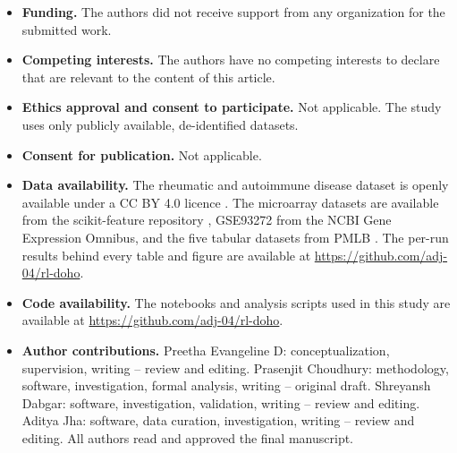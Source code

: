 \documentclass[pdflatex,sn-basic]{sn-jnl}
\begin{document}
\begin{itemize}
\item \textbf{Funding.} The authors did not receive support from any organization for the submitted work.
\item \textbf{Competing interests.} The authors have no competing interests to declare that are relevant to the content of this article.
\item \textbf{Ethics approval and consent to participate.} Not applicable. The study uses only publicly available, de-identified datasets.
\item \textbf{Consent for publication.} Not applicable.
\item \textbf{Data availability.} The rheumatic and autoimmune disease dataset is openly available under a CC BY 4.0 licence \citep{mahdi2025data}. The microarray datasets are available from the scikit-feature repository \citep{li2017fs}, GSE93272 from the NCBI Gene Expression Omnibus, and the five tabular datasets from PMLB \citep{olson2017pmlb}. The per-run results behind every table and figure are available at \url{https://github.com/adj-04/rl-doho}.
\item \textbf{Code availability.} The notebooks and analysis scripts used in this study are available at \url{https://github.com/adj-04/rl-doho}.
\item \textbf{Author contributions.} Preetha Evangeline D: conceptualization, supervision, writing -- review and editing. Prasenjit Choudhury: methodology, software, investigation, formal analysis, writing -- original draft. Shreyansh Dabgar: software, investigation, validation, writing -- review and editing. Aditya Jha: software, data curation, investigation, writing -- review and editing. All authors read and approved the final manuscript.
\end{itemize}


\end{document}
